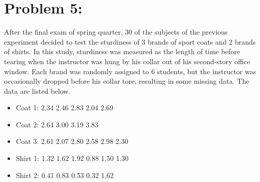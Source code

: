 \documentclass[11pt]{article}
\begin{document}
\section*{Problem 5:}  After the final exam of spring quarter, 30 of the subjects of the previous experiment decided to test the sturdiness of 3 brands of sport coats and 2 brands of shirts.  In this study, sturdiness was measured as the length of time before tearing when the instructor was hung by his collar out of his second-story office window.  Each brand was randomly assigned to 6 students, but the instructor was occasionally dropped before his collar tore, resulting in some missing data.  The data are listed below.
\begin{itemize}
\item[] Coat 1: \hspace{1mm} 2.34 \hspace{1mm} 2.46 \hspace{1mm} 2.83 \hspace{1mm} 2.04 \hspace{1mm} 2.69 
\item[] \vspace{-3mm} Coat 2: \hspace{1mm} 2.64 \hspace{1mm} 3.00 \hspace{1mm} 3.19 \hspace{1mm} 3.83
\item[] \vspace{-3mm}  Coat 3: \hspace{1mm} 2.61 \hspace{1mm} 2.07 \hspace{1mm} 2.80 \hspace{1mm} 2.58 \hspace{1mm} 2.98 \hspace{1mm} 2.30
\item[] \vspace{-3mm}  Shirt \hspace{-0.19mm}1: \hspace{1mm} 1.32 \hspace{1mm} 1.62 \hspace{1mm} 1.92 \hspace{1mm} 0.88 \hspace{1mm} 1.50 \hspace{1mm} 1.30
\item[] \vspace{-3mm}  Shirt \hspace{-0.19mm}2: \hspace{1mm} 0.41 \hspace{1mm} 0.83 \hspace{1mm} 0.53 \hspace{1mm} 0.32 \hspace{1mm} 1.62
\end{itemize}
\end{document}
